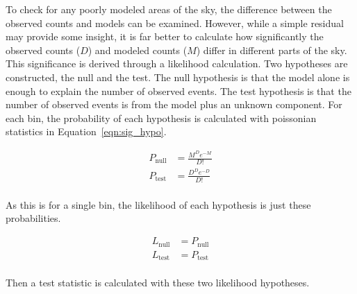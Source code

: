   To check for any poorly modeled areas of the sky, the difference between the observed counts and models can be examined.
  However, while a simple residual may provide some insight, it is far better to calculate how significantly the observed counts ($D$) and modeled counts ($M$) differ in different parts of the sky.
  This significance is derived through a likelihood calculation.
  Two hypotheses are constructed, the null and the test.
  The null hypothesis is that the model alone is enough to explain the number of observed events.
  The test hypothesis is that the number of observed events is from the model plus an unknown component.
  For each bin, the probability of each hypothesis is calculated with poissonian statistics in Equation~\ref{eqn:sig_hypo}.

  \begin{equation}\label{eqn:sig_hypo}
    \begin{split}
      P_{\textrm{null}} & = \frac{M^{D} e^{-M}}{D!} \\
      P_{\textrm{test}} & = \frac{D^{D} e^{-D}}{D!} \\
    \end{split}
  \end{equation}
  
  As this is for a single bin, the likelihood of each hypothesis is just these probabilities.
  
  \begin{equation}
    \begin{split}
      L_{\textrm{null}} & = P_{\textrm{null}} \\
      L_{\textrm{test}} & = P_{\textrm{test}} \\
    \end{split}
  \end{equation}
  
  Then a test statistic is calculated with these two likelihood hypotheses.
  
